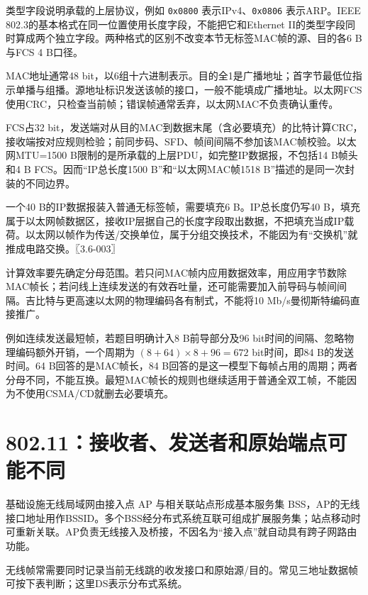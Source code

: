 类型字段说明承载的上层协议，例如 \texttt{0x0800} 表示IPv4、\texttt{0x0806} 表示ARP。IEEE 802.3的基本格式在同一位置使用长度字段，不能把它和Ethernet II的类型字段同时算成两个独立字段。两种格式的区别不改变本节无标签MAC帧的源、目的各6 B与FCS 4 B口径。

MAC地址通常48 bit，以6组十六进制表示。目的全1是广播地址；首字节最低位指示单播与组播。源地址标识发送该帧的接口，一般不能填成广播地址。以太网FCS使用CRC，只检查当前帧；错误帧通常丢弃，以太网MAC不负责确认重传。

FCS占32 bit，发送端对从目的MAC到数据末尾（含必要填充）的比特计算CRC，接收端按对应规则检验；前同步码、SFD、帧间间隔不参加该MAC帧校验。以太网MTU=1500 B限制的是所承载的上层PDU，如完整IP数据报，不包括14 B帧头和4 B FCS。因而``IP总长度1500 B''和``以太网MAC帧1518 B''描述的是同一次封装的不同边界。

一个40 B的IP数据报装入普通无标签帧，需要填充6 B。IP总长度仍写40 B，填充属于以太网帧数据区，接收IP层据自己的长度字段取出数据，不把填充当成IP载荷。以太网以帧作为传送/交换单位，属于分组交换技术，不能因为有``交换机''就推成电路交换。〖3.6-003〗

计算效率要先确定分母范围。若只问MAC帧内应用数据效率，用应用字节数除MAC帧长；若问线上连续发送的有效吞吐量，还可能需要加入前导码与帧间间隔。吉比特与更高速以太网的物理编码各有制式，不能将10 Mb/s曼彻斯特编码直接推广。

例如连续发送最短帧，若题目明确计入8 B前导部分及96 bit时间的间隔、忽略物理编码额外开销，一个周期为 \((8+64)\times8+96=672\) bit时间，即84 B的发送时间。64 B回答的是MAC帧长，84 B回答的是这一模型下每帧占用的周期；两者分母不同，不能互换。最短MAC帧长的规则也继续适用于普通全双工帧，不能因为不使用CSMA/CD就删去必要填充。

\section{802.11：接收者、发送者和原始端点可能不同}\label{cn-03-16}

基础设施无线局域网由接入点 AP 与相关联站点形成基本服务集 BSS，AP的无线接口地址用作BSSID。多个BSS经分布式系统互联可组成扩展服务集；站点移动时可重新关联。AP负责无线接入及桥接，不因名为``接入点''就自动具有跨子网路由功能。

无线帧常需要同时记录当前无线跳的收发接口和原始源/目的。常见三地址数据帧可按下表判断；这里DS表示分布式系统。

